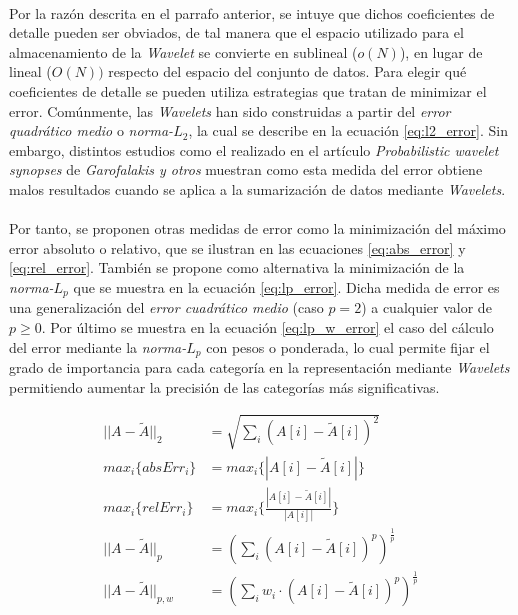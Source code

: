 \documentclass{subfiles}
\begin{document}
        \paragraph{}
        Por la razón descrita en el parrafo anterior, se intuye que dichos coeficientes de detalle pueden ser obviados, de tal manera que el espacio utilizado para el almacenamiento de la \emph{Wavelet} se convierte en sublineal ($o(N)$), en lugar de lineal ($O(N))$ respecto del espacio del conjunto de datos. Para elegir qué coeficientes de detalle se pueden utiliza estrategias que tratan de minimizar el error. Comúnmente, las \emph{Wavelets} han sido construidas a partir del \emph{error quadrático medio} o \emph{norma-$L_2$}, la cual se describe en la ecuación \eqref{eq:l2_error}. Sin embargo, distintos estudios como el realizado en el artículo \emph{Probabilistic wavelet synopses} \cite{garofalakis2004probabilistic} de \emph{Garofalakis y otros} muestran como esta medida del error obtiene malos resultados cuando se aplica a la sumarización de datos mediante \emph{Wavelets}.

        \paragraph{}
        Por tanto, se proponen otras medidas de error como la minimización del máximo error absoluto o relativo, que se ilustran en las ecuaciones \eqref{eq:abs_error} y \eqref{eq:rel_error}. También se propone como alternativa la minimización de la \emph{norma-$L_p$} que se muestra en la ecuación \eqref{eq:lp_error}. Dicha medida de error es una generalización del \emph{error cuadrático medio} (caso $p=2$) a cualquier valor de $p \geq 0$. Por último se muestra en la ecuación \eqref{eq:lp_w_error} el caso del cálculo del error mediante la \emph{norma-$L_p$} con pesos o ponderada, lo cual permite fijar el grado de importancia para cada categoría en la representación mediante \emph{Wavelets} permitiendo aumentar la precisión de las categorías más significativas.

        \begin{align}
        \label{eq:l2_error}
          ||A - \widetilde{A} ||_2  &= \sqrt{\sum_{i}(A[i]-\widetilde{A}[i])^2} \\
        \label{eq:abs_error}
          max_i\{absErr_i\} &= max_i\{|A[i]-\widetilde{A}[i]|\} \\
        \label{eq:rel_error}
          max_i\{relErr_i\} &= max_i\bigg\{\frac{|A[i]-\widetilde{A}[i]|}{|A[i]|} \bigg\} \\
        \label{eq:lp_error}
          ||A - \widetilde{A} ||_{p}  &= (\sum_{i}(A[i]-\widetilde{A}[i])^p)^{\frac{1}{p}} \\
        \label{eq:lp_w_error}
          ||A - \widetilde{A} ||_{p,w}  &= (\sum_{i}w_i \cdot(A[i]-\widetilde{A}[i])^p)^{\frac{1}{p}}
        \end{align}
\end{document}
